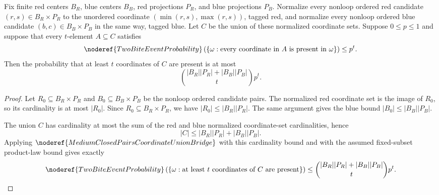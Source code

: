 \begin{lemma}
Fix finite red centers \(B_R\), blue centers \(B_B\), red projections \(P_R\),
and blue projections \(P_B\).  Normalize every nonloop ordered red candidate
\((r,s)\in B_R\times P_R\) to the unordered coordinate
\((\min(r,s),\max(r,s))\), tagged red, and normalize every nonloop ordered
blue candidate \((b,c)\in B_B\times P_B\) in the same way, tagged blue.  Let
\(C\) be the union of these normalized coordinate sets.  Suppose \(0\le p\le1\)
and suppose that every \(t\)-element \(A\subseteq C\) satisfies
\[
\noderef{TwoBiteEventProbability}
\left(\{\omega:\text{every coordinate in }A\text{ is present in }\omega\}\right)
\le p^t .
\]
Then the probability that at least \(t\) coordinates of \(C\) are present is
at most
\[
\binom{|B_R||P_R|+|B_B||P_B|}{t}p^t .
\]
\end{lemma}
\begin{proof}
Let \(R_0\subseteq B_R\times P_R\) and \(B_0\subseteq B_B\times P_B\) be the
nonloop ordered candidate pairs.  The normalized red coordinate set is the
image of \(R_0\), so its cardinality is at most \(|R_0|\).  Since
\(R_0\subseteq B_R\times P_R\), we have \(|R_0|\le |B_R||P_R|\).  The same
argument gives the blue bound \(|B_0|\le |B_B||P_B|\).

The union \(C\) has cardinality at most the sum of the red and blue normalized
coordinate-set cardinalities, hence
\[
|C|\le |B_R||P_R|+|B_B||P_B|.
\]
Applying \(\noderef{MediumClosedPairsCoordinateUnionBridge}\) with this
cardinality bound and with the assumed fixed-subset product-law bound gives
exactly
\[
\noderef{TwoBiteEventProbability}
\left(\{\omega:\text{at least }t\text{ coordinates of }C
\text{ are present}\}\right)
\le
\binom{|B_R||P_R|+|B_B||P_B|}{t}p^t .
\]
\end{proof}
